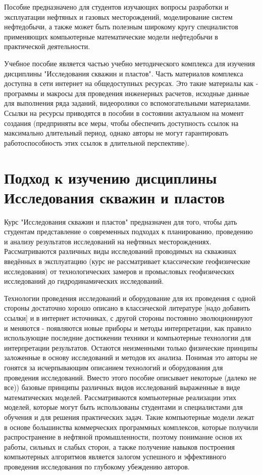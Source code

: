 \documentclass[oneside, openany]{memoir}
\begin{document}
Пособие предназначено для студентов изучающих вопросы разработки и эксплуатации нефтяных и газовых месторождений, моделирование систем нефтедобычи, а также может быть полезным широкому кругу специалистов применяющих компьютерные математические модели нефтедобычи в практической деятельности. 

Учебное пособие является частью учебно методического комплекса для изучения дисциплины "Исследования скважин и пластов". Часть материалов комплекса доступна в сети интернет на общедоступных ресурсах. Это такие материалы как - программы и макросы для проведения инженерных расчетов, исходные данные для выполнения ряда заданий, видеоролики со вспомогательными материалами. Ссылки на ресурсы приводятся в пособии в состоянии актуальном на момент создания (предприняты все меры, чтобы обеспечить доступность ссылок на максимально длительный период, однако авторы не могут гарантировать работоспособность этих ссылок в длительной перспективе).




\section{Подход к изучению дисциплины Исследования скважин и пластов}
Курс "Исследования скважин и пластов" предназначен для того, чтобы дать студентам представление о современных подходах к планированию, проведению и анализу результатов исследований на нефтяных месторождениях. Рассматриваются различных виды исследований проводимых на скважинах введённых в эксплуатацию (курс не рассматривает классические геофизические исследования) от технологических замеров и промысловых геофизических исследований до гидродинамических исследований.

Технологии проведения исследований и оборудование для их проведения с одной стороны достаточно хорошо описано в классической литературе [надо добавить ссылки] и в интернет источниках, с другой стороны постоянно эволюционируют и меняются - появляются новые приборы и методы интерпретации, как правило использующие последние достижении техники и компьютерные технологии для интерпретации результатов. Остаются неизменными только физические принципы заложенные в основу исследований и методов их анализа. Понимая это авторы не гонятся за исчерпывающим описанием технологий и оборудования для проведения исследований. Вместо этого пособие описывает некоторые (далеко не все)) базовые принципы различных видов исследований выраженные в виде математических моделей. Рассматриваются компьютерные реализации этих моделей, которые могут быть использованы студентами и специалистами для обучения и для решения практических задач. Такие компьютерные модели лежат в основе большинства коммерческих программных комплексов, которые получили распространение в нефтяной промышленности, поэтому понимание основ их работы, сильных и слабых сторон, а также получение навыков построения компьютерных алгоритмов является залогом успешного и эффективного проведения исследования по глубокому убеждению авторов.
\end{document}
